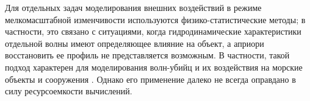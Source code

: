 Для отдельных задач моделирования внешних воздействий в режиме мелкомасштабной изменчивости используются физико-статистические методы; в частности, это связано с ситуациями, когда гидродинамические характеристики отдельной волны имеют определяющее влияние на объект, а априори восстановить ее профиль не представляется возможным. В частности, такой подход характерен для моделирования волн-убийц и их воздействия на морские объекты и сооружения \citep{dk12}\citep{dk13}. Однако его применение далеко не всегда оправдано в силу ресурсоемкости вычислений.
